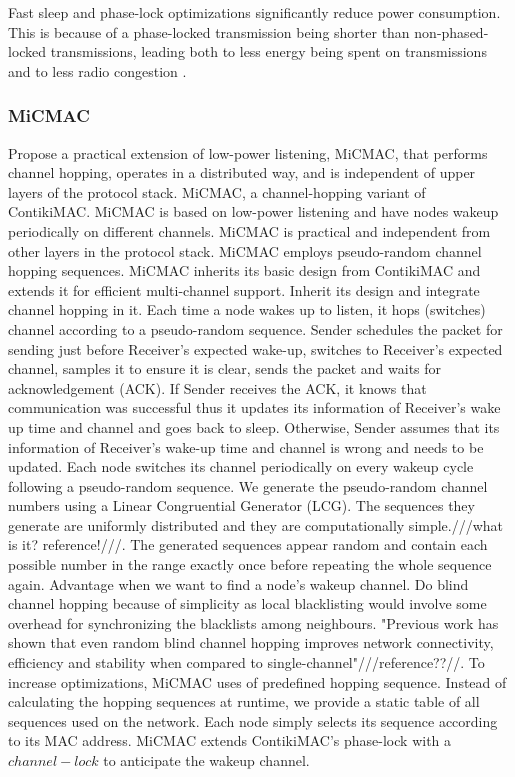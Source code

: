 Fast sleep and phase-lock optimizations significantly reduce power consumption. This is because of a phase-locked transmission being shorter than non-phased-locked transmissions, leading both to less energy being spent on transmissions and to less radio congestion \cite{contikimac}.

\subsubsection{MiCMAC}
Propose a practical extension of low-power listening, MiCMAC, that performs channel hopping, operates in a distributed way, and is independent of upper layers of the protocol stack. MiCMAC, a channel-hopping variant of ContikiMAC. MiCMAC is based on low-power listening and have nodes wakeup periodically on different channels. MiCMAC is practical and independent from other layers in the protocol stack. MiCMAC employs pseudo-random channel hopping sequences. MiCMAC inherits its basic design from ContikiMAC and extends it for efficient multi-channel support. Inherit its design and integrate channel hopping in it. Each time a node wakes up to listen, it hops (switches) channel according to a pseudo-random sequence. Sender schedules the packet for sending just before Receiver's expected wake-up, switches to Receiver's expected channel, samples it to ensure it is clear, sends the packet and waits for acknowledgement (ACK). If Sender receives the ACK, it knows that communication was successful thus it updates its information of Receiver's wake up time and channel and goes back to sleep. Otherwise, Sender assumes that its information of Receiver's wake-up time and channel is wrong and needs to be updated. Each node switches its channel periodically on every wakeup cycle following a pseudo-random sequence. We generate the pseudo-random channel numbers using a Linear Congruential Generator (LCG). The sequences they generate are uniformly distributed and they are computationally simple.///what is it? reference!///. The generated sequences appear random and contain each possible number in the range exactly once before repeating the whole sequence again. Advantage when we want to find a node's wakeup channel. Do blind channel hopping because of simplicity as local blacklisting would involve some overhead for synchronizing the blacklists among neighbours. "Previous work has shown that even random blind channel hopping improves network connectivity, efficiency and stability when compared to single-channel"///reference??//. To increase optimizations, MiCMAC uses of predefined hopping sequence. Instead of calculating the hopping sequences at runtime, we provide a static table of all sequences used on the network. Each node simply selects its sequence according to its MAC address. MiCMAC extends ContikiMAC's phase-lock with a $channel-lock$ to anticipate the wakeup channel.

